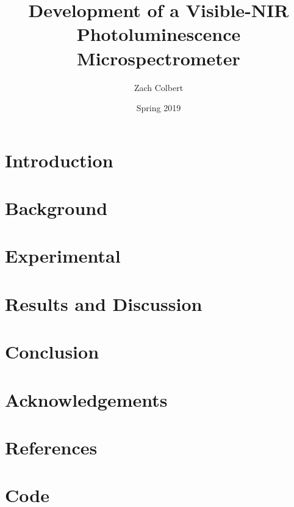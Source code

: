 \documentclass{report}
\title{Development of a Visible-NIR Photoluminescence Microspectrometer}
\author{Zach Colbert}
\date{Spring 2019}
\renewenvironment{abstract}
 {%
  \global\setbox\abstractbox=\vtop\bgroup
  \begin{center}\bfseries\abstractname\end{center}%
 }
 {\par\egroup}
\begin{document}


  \tableofcontents


  \chapter{Introduction}
  

  \chapter{Background}
  

  \chapter{Experimental}
  

  \chapter{Results and Discussion}
  


  \chapter{Conclusion}

  \chapter*{Acknowledgements}

  \chapter*{References}


  \appendix
  \chapter{Code}
\end{document}
